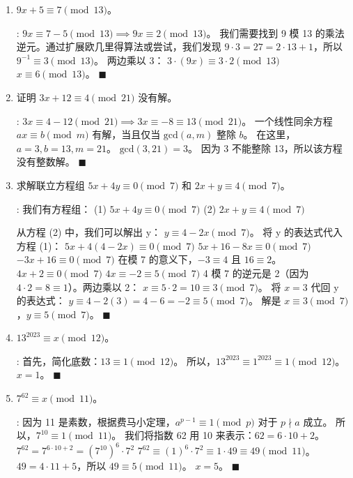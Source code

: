\documentclass[11pt]{article}
\newenvironment{qparts}{\begin{enumerate}[{(}a{)}]}{\end{enumerate}}
\def\endproofmark{$\blacksquare$}
\newenvironment{proof}{\par\noindent{\bf 证明}:}{\endproofmark\smallskip}
\begin{document}
\begin{qparts}
\item $9x+5\equiv7 \pmod{13}$。
\begin{proof}
$9x \equiv 7-5 \pmod{13} \implies 9x \equiv 2 \pmod{13}$。
我们需要找到 9 模 13 的乘法逆元。通过扩展欧几里得算法或尝试，我们发现 $9 \cdot 3 = 27 = 2 \cdot 13 + 1$，所以 $9^{-1} \equiv 3 \pmod{13}$。
两边乘以 3：
$3 \cdot (9x) \equiv 3 \cdot 2 \pmod{13}$
$x \equiv 6 \pmod{13}$。
\end{proof}

\item 证明 $3x+12\equiv4 \pmod{21}$ 没有解。
\begin{proof}
$3x \equiv 4-12 \pmod{21} \implies 3x \equiv -8 \equiv 13 \pmod{21}$。
一个线性同余方程 $ax \equiv b \pmod m$ 有解，当且仅当 $\text{gcd}(a, m)$ 整除 $b$。
在这里，$a=3, b=13, m=21$。
$\text{gcd}(3, 21) = 3$。
因为 3 不能整除 13，所以该方程没有整数解。
\end{proof}

\item 求解联立方程组 $5x+4y\equiv0 \pmod{7}$ 和 $2x+y\equiv4 \pmod{7}$。
\begin{proof}
我们有方程组：
(1) $5x+4y\equiv0 \pmod{7}$
(2) $2x+y\equiv4 \pmod{7}$

从方程 (2) 中，我们可以解出 y：
$y \equiv 4 - 2x \pmod{7}$。
将 y 的表达式代入方程 (1)：
$5x + 4(4-2x) \equiv 0 \pmod{7}$
$5x + 16 - 8x \equiv 0 \pmod{7}$
$-3x + 16 \equiv 0 \pmod{7}$
在模 7 的意义下，$-3 \equiv 4$ 且 $16 \equiv 2$。
$4x + 2 \equiv 0 \pmod{7}$
$4x \equiv -2 \equiv 5 \pmod{7}$
4 模 7 的逆元是 2（因为 $4 \cdot 2 = 8 \equiv 1$）。两边乘以 2：
$x \equiv 5 \cdot 2 = 10 \equiv 3 \pmod{7}$。
将 $x=3$ 代回 y 的表达式：
$y \equiv 4 - 2(3) = 4 - 6 = -2 \equiv 5 \pmod{7}$。
解是 $x \equiv 3 \pmod{7}$，$y \equiv 5 \pmod{7}$。
\end{proof}

\item $13^{2023}\equiv x \pmod{12}$。
\begin{proof}
首先，简化底数：$13 \equiv 1 \pmod{12}$。
所以，$13^{2023} \equiv 1^{2023} \equiv 1 \pmod{12}$。
$x=1$。
\end{proof}

\item $7^{62}\equiv x \pmod{11}$。
\begin{proof}
因为 11 是素数，根据费马小定理，$a^{p-1} \equiv 1 \pmod p$ 对于 $p \nmid a$ 成立。
所以，$7^{10} \equiv 1 \pmod{11}$。
我们将指数 62 用 10 来表示：$62 = 6 \cdot 10 + 2$。
$7^{62} = 7^{6 \cdot 10 + 2} = (7^{10})^6 \cdot 7^2$
$7^{62} \equiv (1)^6 \cdot 7^2 \equiv 1 \cdot 49 \equiv 49 \pmod{11}$。
$49 = 4 \cdot 11 + 5$，所以 $49 \equiv 5 \pmod{11}$。
$x=5$。
\end{proof}
\end{qparts}
\end{document}
